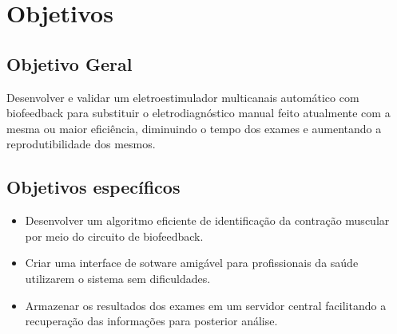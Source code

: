 \section{Objetivos}

\subsection{Objetivo Geral}
Desenvolver e validar um eletroestimulador multicanais automático com biofeedback para substituir o eletrodiagnóstico manual feito atualmente com a mesma ou maior eficiência, diminuindo o tempo dos exames e aumentando a reprodutibilidade dos mesmos.
\subsection{Objetivos específicos}
\begin{itemize}
  \item Desenvolver um algoritmo eficiente de identificação da contração muscular por meio do circuito de biofeedback.
  \item Criar uma interface de sotware amigável para profissionais da saúde utilizarem o sistema sem dificuldades.
  \item Armazenar os resultados dos exames em um servidor central facilitando a recuperação das informações para posterior análise.
\end{itemize}